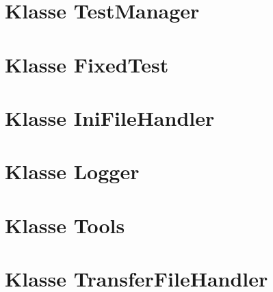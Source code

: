 \section{Klasse TestManager}
\paragraph{}

\subsection{}


\section{Klasse FixedTest}
\paragraph{}

\subsection{}


\section{Klasse IniFileHandler}
\paragraph{}

\subsection{}


\section{Klasse Logger}
\paragraph{}

\subsection{}


\section{Klasse Tools}
\paragraph{}

\subsection{}


\section{Klasse TransferFileHandler}
\paragraph{}

\subsection{}